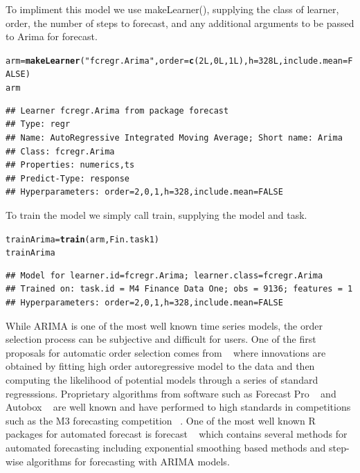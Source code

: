 \documentclass{article}\usepackage[]{graphicx}\usepackage[]{color}
\makeatletter
\newcommand{\hlnum}[1]{\textcolor[rgb]{0.686,0.059,0.569}{#1}}%
\newcommand{\hlstr}[1]{\textcolor[rgb]{0.192,0.494,0.8}{#1}}%
\newcommand{\hlstd}[1]{\textcolor[rgb]{0.345,0.345,0.345}{#1}}%
\newcommand{\hlkwb}[1]{\textcolor[rgb]{0.69,0.353,0.396}{#1}}%
\newcommand{\hlkwc}[1]{\textcolor[rgb]{0.333,0.667,0.333}{#1}}%
\newcommand{\hlkwd}[1]{\textcolor[rgb]{0.737,0.353,0.396}{\textbf{#1}}}%
\newenvironment{kframe}{%
 \def\at@end@of@kframe{}%
 \ifinner\ifhmode%
  \def\at@end@of@kframe{\end{minipage}}%
  \begin{minipage}{\columnwidth}%
 \fi\fi%
 \def\FrameCommand##1{\hskip\@totalleftmargin \hskip-\fboxsep
 \colorbox{shadecolor}{##1}\hskip-\fboxsep
     \hskip-\linewidth \hskip-\@totalleftmargin \hskip\columnwidth}%
 \MakeFramed {\advance\hsize-\width
   \@totalleftmargin\z@ \linewidth\hsize
   \@setminipage}}%
 {\par\unskip\endMakeFramed%
 \at@end@of@kframe}
\newenvironment{knitrout}{}{} %
\theoremstyle{definition}
\newcommand\code{\@codex}
\def\@codex#1{{\normalfont\ttfamily\hyphenchar\font=-1 #1}}
\let\proglang=\textsf
\newcommand{\pkg}[1]{{\fontseries{b}\selectfont #1}}
\makeatother
\begin{document}
To impliment this model we use \code{makeLearner()}, supplying the class of learner, order, the number of steps to forecast, and any additional arguments to be passed to \code{Arima} for \pkg{forecast}. 

\begin{knitrout}
\color{fgcolor}\begin{kframe}
\begin{alltt}
\hlstd{arm} \hlkwb{=} \hlkwd{makeLearner}\hlstd{(}\hlstr{"fcregr.Arima"}\hlstd{,} \hlkwc{order} \hlstd{=} \hlkwd{c}\hlstd{(}\hlnum{2L}\hlstd{,}\hlnum{0L}\hlstd{,}\hlnum{1L}\hlstd{),} \hlkwc{h} \hlstd{=} \hlnum{328L}\hlstd{,} \hlkwc{include.mean} \hlstd{=} \hlnum{FALSE}\hlstd{)}
\hlstd{arm}
\end{alltt}
\begin{verbatim}
## Learner fcregr.Arima from package forecast
## Type: regr
## Name: AutoRegressive Integrated Moving Average; Short name: Arima
## Class: fcregr.Arima
## Properties: numerics,ts
## Predict-Type: response
## Hyperparameters: order=2,0,1,h=328,include.mean=FALSE
\end{verbatim}
\end{kframe}
\end{knitrout}

To train the model we simply call train, supplying the model and task.

\begin{knitrout}
\color{fgcolor}\begin{kframe}
\begin{alltt}
\hlstd{trainArima} \hlkwb{=} \hlkwd{train}\hlstd{(arm, Fin.task1 )}
\hlstd{trainArima}
\end{alltt}
\begin{verbatim}
## Model for learner.id=fcregr.Arima; learner.class=fcregr.Arima
## Trained on: task.id = M4 Finance Data One; obs = 9136; features = 1
## Hyperparameters: order=2,0,1,h=328,include.mean=FALSE
\end{verbatim}
\end{kframe}
\end{knitrout}

While ARIMA is one of the most well known time series models, the order selection process can be subjective and difficult for users. One of the first proposals for automatic order selection comes from ~\cite{hannanOrder} where innovations are obtained by fitting high order autoregressive model to the data and then computing the likelihood of potential models through a series of standard regresssions. Proprietary algorithms from software such as \proglang{Forecast Pro} ~\cite{forecastpro} and \proglang{Autobox} ~\cite{reillyautobox} are well known and have performed to high standards in competitions such as the M3 forecasting competition ~\cite{Makridakis2000451}. One of the most well known R packages for automated forecast is \pkg{forecast} ~\cite{HyndForecast} which contains several methods for automated forecasting including exponential smoothing based methods and step-wise algorithms for forecasting with ARIMA models.
\end{document}
